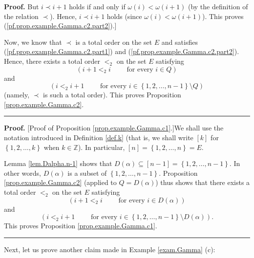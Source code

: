 \documentclass[numbers=enddot,12pt,final,onecolumn,notitlepage,abstracton]{scrartcl}
\theoremstyle{definition}
\newenvironment{proof}[1][Proof]{\noindent\textbf{#1.} }{\ \rule{0.5em}{0.5em}}
\newenvironment{verlong}{}{}
\begin{document}
\begin{verlong}
\begin{footnotesize}
\begin{proof}
But $i\prec i+1$ holds if and only if $\omega\left(  i\right)  <\omega\left(
i+1\right)  $ (by the definition of the relation $\prec$). Hence, $i\prec i+1$
holds (since $\omega\left(  i\right)  <\omega\left(  i+1\right)  $). This
proves (\ref{pf.prop.example.Gamma.c2.part2}).]

Now, we know that $\prec$ is a total order on the set $E$ and satisfies
(\ref{pf.prop.example.Gamma.c2.part1}) and
(\ref{pf.prop.example.Gamma.c2.part2}). Hence, there exists a total order
$<_{2}$ on the set $E$ satisfying%
\[
\left(  i+1<_{2}i\qquad\text{ for every }i\in Q\right)
\]
and
\[
\left(  i<_{2}i+1\qquad\text{ for every }i\in\left\{  1,2,\ldots,n-1\right\}
\setminus Q\right)
\]
(namely, $\prec$ is such a total order). This proves Proposition
\ref{prop.example.Gamma.c2}.
\end{proof}

\begin{proof}
[Proof of Proposition \ref{prop.example.Gamma.c1}.]We shall use the notation
introduced in Definition \ref{def.k} (that is, we shall write $\left[
k\right]  $ for $\left\{  1,2,\ldots,k\right\}  $ when $k\in\mathbb{Z}$). In
particular, $\left[  n\right]  =\left\{  1,2,\ldots,n\right\}  =E$.

Lemma \ref{lem.Dalpha.n-1} shows that $D\left(  \alpha\right)  \subseteq
\left[  n-1\right]  =\left\{  1,2,\ldots,n-1\right\}  $. In other words,
$D\left(  \alpha\right)  $ is a subset of $\left\{  1,2,\ldots,n-1\right\}  $.
Proposition \ref{prop.example.Gamma.c2} (applied to $Q=D\left(  \alpha\right)
$) thus shows that there exists a total order $<_{2}$ on the set $E$
satisfying%
\[
\left(  i+1<_{2}i\qquad\text{ for every }i\in D\left(  \alpha\right)  \right)
\]
and
\[
\left(  i<_{2}i+1\qquad\text{ for every }i\in\left\{  1,2,\ldots,n-1\right\}
\setminus D\left(  \alpha\right)  \right)  .
\]
This proves Proposition \ref{prop.example.Gamma.c1}.
\end{proof}

Next, let us prove another claim made in Example \ref{exam.Gamma} (c):


\end{footnotesize}
\end{verlong}
\end{document}

